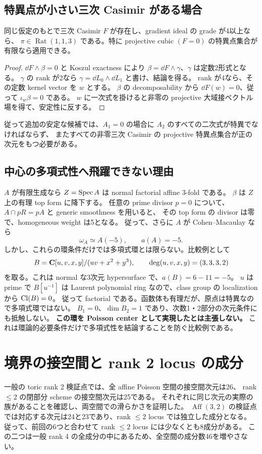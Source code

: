 \documentclass[11pt,a4paper]{ltjsarticle}
\DeclareMathOperator{\Rat}{Rat}\DeclareMathOperator{\Log}{Log}\DeclareMathOperator{\Aff}{Aff}
\theoremstyle{remark}\newtheorem{remark}[theorem]{注意}\renewcommand{\proofname}{証明}
\begin{document}
\subsection{特異点が小さい三次 Casimir がある場合}
\begin{proposition}\label{prop:cubic}
同じ仮定のもとで三次 Casimir $F$ が存在し、gradient ideal の grade が4以上なら、
$\pi\in\Rat(1,1,3)$ である。特に projective cubic $(F=0)$ の特異点集合が有限なら適用できる。
\end{proposition}
\begin{proof}
$\dd F\wedge\beta=0$ と Koszul exactness により $\beta=\dd F\wedge\gamma$、$\gamma$ は定数2形式となる。
$\gamma$ の rank が2なら $\gamma=\dd L_0\wedge\dd L_1$ と書け、結論を得る。
rank が4なら、その定数 kernel vector を $w$ とする。
$\beta$ の decomposability から $\dd F(w)=0$、従って $\iota_w\beta=0$ である。
$w$ に一次式を掛けると非零の projective 大域接ベクトル場を得て、安定性に反する。
\end{proof}

従って追加の安定な候補では、$A_1=0$ の場合に $A_2$ のすべての二次式が特異でなければならず、
またすべての非零三次 Casimir の projective 特異点集合が正の次元をもつ必要がある。

\subsection{中心の多項式性へ飛躍できない理由}
$A$ が有限生成なら $Z=\operatorname{Spec} A$ は normal factorial affine 3-fold である。
$\beta$ は $Z$ 上の有理 top form に降下する。
任意の prime divisor $p=0$ について、$A\cap pR=pA$ と generic smoothness を用いると、
その top form の divisor は零で、homogeneous weight は5となる。
従って、さらに $A$ が Cohen--Macaulay なら
\[
 \omega_A\simeq A(-5),\qquad a(A)=-5.
\]
しかし、これらの環条件だけでは多項式環とは限らない。比較例として
\[
 B=\mathbf C[u,v,x,y]/(uv+x^2+y^3),\qquad
 \deg(u,v,x,y)=(3,3,3,2)
\]
を取る。これは normal な3次元 hypersurface で、$a(B)=6-11=-5$。
$u$ は prime で $B[u^{-1}]$ は Laurent polynomial ring なので、class group の localization から $\operatorname{Cl}(B)=0$。
従って factorial である。函数体も有理だが、原点は特異なので多項式環ではない。
$B_1=0$、$\dim B_2=1$ であり、次数1・2部分の次元条件にも抵触しない。
\textbf{この環を Poisson center として実現したとは主張しない。}
これは環論的必要条件だけで多項式性を結論することを防ぐ比較例である。

\section{境界の接空間と rank 2 locus の成分}
一般の toric rank 2 検証点では、全 affine Poisson 空間の接空間次元は26、
rank $\le2$ の閉部分 scheme の接空間次元は25である。
それぞれに同じ次元の実際の族があることを確認し、両空間での滑らかさを証明した。
$\Aff(3,2)$ の検証点では対応する次元は24と23であり、rank $\le2$ locus では独立した成分となる。
従って、前回の6つと合わせて rank $\le2$ locus には少なくとも8成分がある。
この二つは一般 rank 4 の全成分の中にあるため、全空間の成分数46を増やさない。
\end{document}
